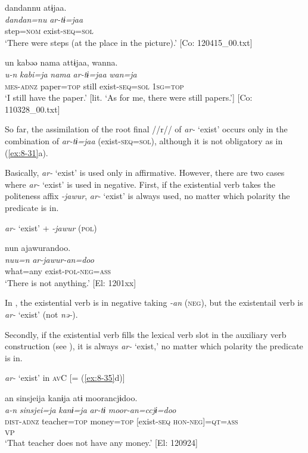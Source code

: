 \textbf{\ea\label{ex:8-31}
}\ea
{\TM}
\glll  dandannu  atɨjaa.\\
\textit{dandan=nu}  \textit{ar-tɨ=jaa}\\
step=\textsc{nom}  exist-\textsc{seq}=\textsc{sol}\\
\glt ‘There were steps (at the place in the picture).’ [Co: 120415\_00.txt]

\ex
{\TM}
\glll  un  kabəə  nama  attɨjaa,  wanna.\\
\textit{u-n}  \textit{kabi=ja}  \textit{nama}  \textit{ar-tɨ=jaa}  \textit{wan=ja}\\
\textsc{mes}-\textsc{adnz}  paper=\textsc{top}  still  exist-\textsc{seq}=\textsc{sol}  1\textsc{sg}=\textsc{top}\\
\glt ‘I still have the paper.’ [lit. ‘As for me, there were still papers.’]       [Co: 110328\_00.txt]
\z

So far, the assimilation of the root final //r// of \textit{ar-} ‘exist’ occurs only in the combination of \textit{ar-tɨ=jaa} (exist-\textsc{seq}=\textsc{sol}), although it is not obligatory as in (\ref{ex:8-31}a).

  Basically, \textit{ar-} ‘exist’ is used only in affirmative. However, there are two cases where \textit{ar-} ‘exist’ is used in negative. First, if the existential verb takes the politeness affix \textit{-jawur}, \textit{ar-} ‘exist’ is always used, no matter which polarity the predicate is in.

\ea\label{ex:8-32}
  \textit{ar-} ‘exist’ + \textit{-jawur} (\textsc{pol})

  {\TM}
\glll  nun  ajawurandoo.\\
\textit{nuu=n}  \textit{ar-jawur-an=doo}\\
    what=any  exist-\textsc{pol}-\textsc{neg}=\textsc{ass}\\
\glt ‘There is not anything.’ [El: 1201xx]
\z

In , the existential verb is in negative taking \textit{-an} (\textsc{neg}), but the existentail verb is \textit{ar-} ‘exist’ (not \textit{nə-}).

  Secondly, if the existential verb fills the lexical verb slot in the auxiliary verb construction (see ), it is always \textit{ar-} ‘exist,’ no matter which polarity the predicate is in.

\ea\label{ex:8-33}
  \textit{ar-} ‘exist’ in \textsc{av}C [= (\ref{ex:8-35}d)]

  {\TM}
\glll  an  sinsjeija  kanɨja  atɨ  moorancjɨdoo.\\
\textit{a-n}  \textit{sinsjei=ja}  \textit{kanɨ=ja}  \textit{ar-tɨ}  \textit{moor-an=ccjɨ=doo}\\
    \textsc{dist}-\textsc{adnz}  teacher=\textsc{top}  money=\textsc{top}  [exist-\textsc{seq}  \textsc{hon}-\textsc{neg}]=\textsc{qt}=\textsc{ass}\\
          [Lex. verb  Aux. verb]\textsubscript{VP}\\
\glt ‘That teacher does not have any money.’ [El: 120924]
\z

